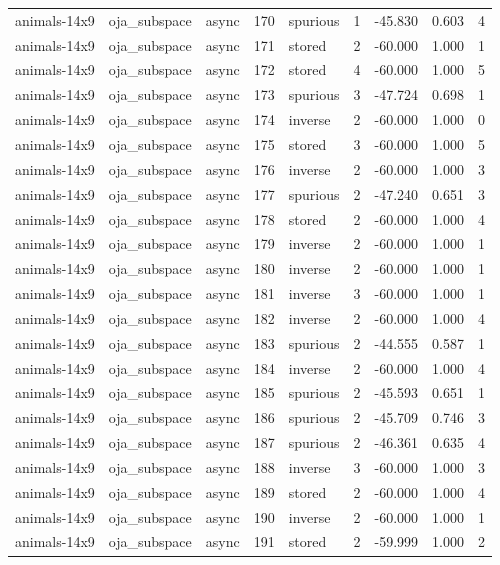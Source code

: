 \begin{tabular}{lllrlrrrr}
animals-14x9 & oja\_subspace & async & 170 & spurious & 1 & -45.830 & 0.603 & 4 \\
animals-14x9 & oja\_subspace & async & 171 & stored & 2 & -60.000 & 1.000 & 1 \\
animals-14x9 & oja\_subspace & async & 172 & stored & 4 & -60.000 & 1.000 & 5 \\
animals-14x9 & oja\_subspace & async & 173 & spurious & 3 & -47.724 & 0.698 & 1 \\
animals-14x9 & oja\_subspace & async & 174 & inverse & 2 & -60.000 & 1.000 & 0 \\
animals-14x9 & oja\_subspace & async & 175 & stored & 3 & -60.000 & 1.000 & 5 \\
animals-14x9 & oja\_subspace & async & 176 & inverse & 2 & -60.000 & 1.000 & 3 \\
animals-14x9 & oja\_subspace & async & 177 & spurious & 2 & -47.240 & 0.651 & 3 \\
animals-14x9 & oja\_subspace & async & 178 & stored & 2 & -60.000 & 1.000 & 4 \\
animals-14x9 & oja\_subspace & async & 179 & inverse & 2 & -60.000 & 1.000 & 1 \\
animals-14x9 & oja\_subspace & async & 180 & inverse & 2 & -60.000 & 1.000 & 1 \\
animals-14x9 & oja\_subspace & async & 181 & inverse & 3 & -60.000 & 1.000 & 1 \\
animals-14x9 & oja\_subspace & async & 182 & inverse & 2 & -60.000 & 1.000 & 4 \\
animals-14x9 & oja\_subspace & async & 183 & spurious & 2 & -44.555 & 0.587 & 1 \\
animals-14x9 & oja\_subspace & async & 184 & inverse & 2 & -60.000 & 1.000 & 4 \\
animals-14x9 & oja\_subspace & async & 185 & spurious & 2 & -45.593 & 0.651 & 1 \\
animals-14x9 & oja\_subspace & async & 186 & spurious & 2 & -45.709 & 0.746 & 3 \\
animals-14x9 & oja\_subspace & async & 187 & spurious & 2 & -46.361 & 0.635 & 4 \\
animals-14x9 & oja\_subspace & async & 188 & inverse & 3 & -60.000 & 1.000 & 3 \\
animals-14x9 & oja\_subspace & async & 189 & stored & 2 & -60.000 & 1.000 & 4 \\
animals-14x9 & oja\_subspace & async & 190 & inverse & 2 & -60.000 & 1.000 & 1 \\
animals-14x9 & oja\_subspace & async & 191 & stored & 2 & -59.999 & 1.000 & 2 \\

\end{tabular}
